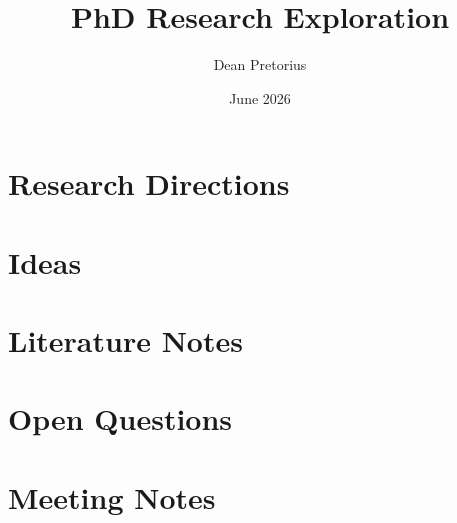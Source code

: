 \documentclass[11pt,a4paper]{article}
\title{PhD Research Exploration}
\author{Dean Pretorius}
\date{June 2026}
\begin{document}
\maketitle
\tableofcontents
\newpage

\section{Research Directions}


\section{Ideas}


\section{Literature Notes}


\section{Open Questions}


\section{Meeting Notes}




\end{document}

